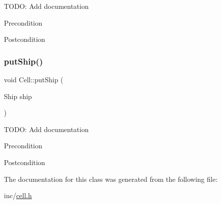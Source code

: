 T\+O\+DO\+: Add documentation \begin{DoxyPrecond}{Precondition}

\end{DoxyPrecond}
\begin{DoxyPostcond}{Postcondition}

\end{DoxyPostcond}
\mbox{\label{classCell_a41ea2ddfdeeba008ecd879a7ccb2b140}} 
\subsubsection{\texorpdfstring{putShip()}{putShip()}}
{\footnotesize\ttfamily void Cell\+::put\+Ship (\begin{DoxyParamCaption}\item[{Ship}]{ship }\end{DoxyParamCaption})}

T\+O\+DO\+: Add documentation \begin{DoxyPrecond}{Precondition}

\end{DoxyPrecond}
\begin{DoxyPostcond}{Postcondition}

\end{DoxyPostcond}


The documentation for this class was generated from the following file\+:\begin{DoxyCompactItemize}
\item 
inc/\mbox{\hyperlink{cell_8h}{cell.\+h}}\end{DoxyCompactItemize}
